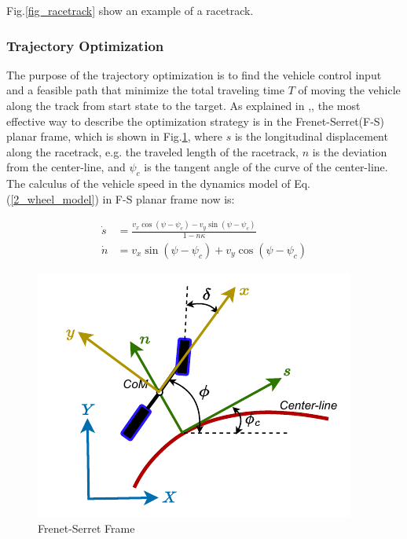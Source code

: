 \documentclass[conference, onecolumn]{IEEEtran}
\begin{document}
Fig.\ref{fig_racetrack} show an example of a racetrack.

\subsubsection[optimization]{Trajectory Optimization}\label{trajectoryoptimization}
The purpose of the trajectory optimization is to find the vehicle control input and a feasible path that minimize the total traveling time $T$ of moving the vehicle along the track from start state to the target. As explained in \cite{LOT20147559},\cite{Liniger_2014}, the most effective way to describe the optimization strategy is in the Frenet-Serret(F-S) planar frame, which is shown in Fig.\ref{fig_sn}, where $s$ is the longitudinal displacement along the racetrack, e.g. the traveled length of the racetrack, $n$ is the deviation from the center-line, and $\psi_c$ is the tangent angle of the curve of the center-line. The calculus of the vehicle speed in the dynamics model of Eq.(\ref{2_wheel_model}) in F-S planar frame now is:

\begin{subequations}\label{dynamics_fs}
	\begin{align}
		\dot{s}  & = \frac{v_x \cos(\psi-\psi_c)-v_y \sin(\psi-\psi_c)}{1-n\kappa}
		\label{s_dot}	\\ 
		\dot{n} & = v_x \sin(\psi-\psi_c)+v_y \cos(\psi-\psi_c) 
	\end{align}
\end{subequations}

\begin{figure}[h]
	\centering
	\captionsetup{justification=centering}
	\includegraphics{sn.pdf}
	\caption{Frenet-Serret Frame}
	\label{fig_sn}
\end{figure}
\end{document}
